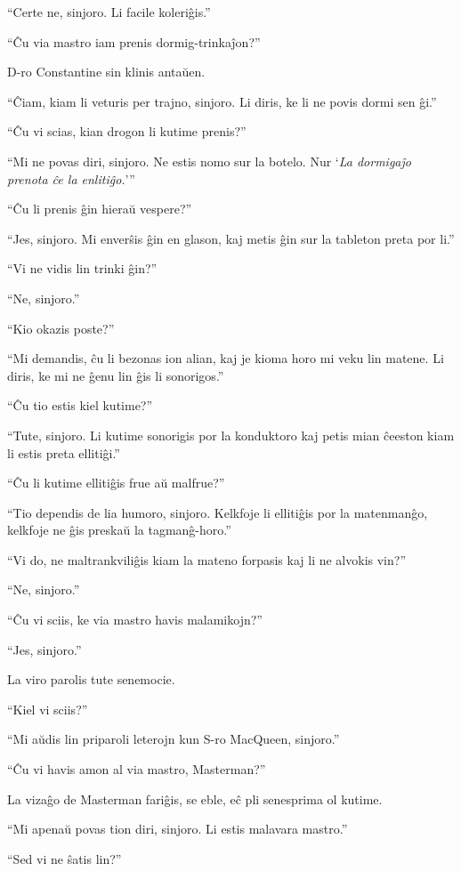 ``Certe ne, sinjoro. Li facile koleriĝis.''

``Ĉu via mastro iam prenis dormig-trinkaĵon?''

D-ro Constantine sin klinis antaŭen.

``Ĉiam, kiam li veturis per trajno, sinjoro. Li diris, ke li ne povis dormi sen ĝi.''

``Ĉu vi scias, kian drogon li kutime prenis?''

``Mi ne povas diri, sinjoro. Ne estis nomo sur la botelo. Nur `\emph{La dormigaĵo prenota ĉe la enlitiĝo.}'''

``Ĉu li prenis ĝin hieraŭ vespere?''

``Jes, sinjoro. Mi enverŝis ĝin en glason, kaj metis ĝin sur la tableton preta por li.''

``Vi ne vidis lin trinki ĝin?''

``Ne, sinjoro.''

``Kio okazis poste?''

``Mi demandis, ĉu li bezonas ion alian, kaj je kioma horo mi veku lin matene. Li diris, ke mi ne ĝenu lin ĝis li sonorigos.''

``Ĉu tio estis kiel kutime?''

``Tute, sinjoro. Li kutime sonorigis por la konduktoro kaj petis mian ĉeeston kiam li estis preta ellitiĝi.''

``Ĉu li kutime ellitiĝis frue aŭ malfrue?''

``Tio dependis de lia humoro, sinjoro. Kelkfoje li ellitiĝis por la matenmanĝo, kelkfoje ne ĝis preskaŭ la tagmanĝ-horo.''

``Vi do, ne maltrankviliĝis kiam la mateno forpasis kaj li ne alvokis vin?''

``Ne, sinjoro.''

``Ĉu vi sciis, ke via mastro havis malamikojn?''

``Jes, sinjoro.''

La viro parolis tute senemocie.

``Kiel vi sciis?''

``Mi aŭdis lin priparoli leterojn kun S-ro MacQueen, sinjoro.''

``Ĉu vi havis amon al via mastro, Masterman?''

La vizaĝo de Masterman fariĝis, se eble, eĉ pli senesprima ol kutime.

``Mi apenaŭ povas tion diri, sinjoro. Li estis malavara mastro.''

``Sed vi ne ŝatis lin?''

